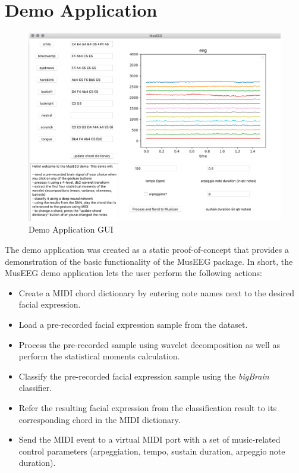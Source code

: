 \section{Demo Application}
  \begin{figure}[htbp!]
	\centering
		\includegraphics[width=1\columnwidth]{demoApp.png}
	\caption{Demo Application GUI}
	\label{fig:demoApp}
\end{figure} 

The demo application was created as a static proof-of-concept that provides a demonstration of the basic functionality of the MusEEG package. In short, the MusEEG demo application lets the user perform the following actions:
\begin{itemize}
  \item	Create a MIDI chord dictionary by entering note names next to the desired facial expression.
\item	Load a pre-recorded facial expression sample from the dataset.
\item	Process the pre-recorded sample using wavelet decomposition as well as perform the statistical moments calculation.
\item	Classify the pre-recorded facial expression sample using the \textit{bigBrain} classifier.
\item	Refer the resulting facial expression from the classification result to its corresponding chord in the MIDI dictionary.
\item	Send the MIDI event to a virtual MIDI port with a set of music-related control parameters (arpeggiation, tempo, sustain duration, arpeggio note duration). 
\end{itemize}


